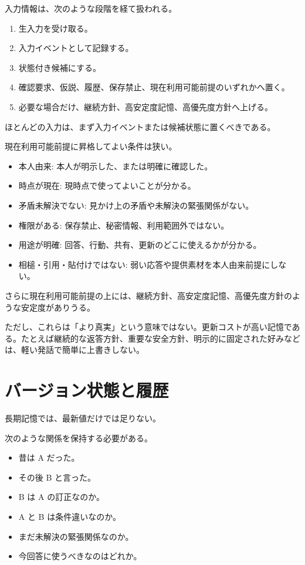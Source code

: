 \documentclass[12pt,a4paper]{article}
\begin{document}
入力情報は、次のような段階を経て扱われる。

\begin{enumerate}
\def\labelenumi{\arabic{enumi}.}
\tightlist
\item
  生入力を受け取る。
\item
  入力イベントとして記録する。
\item
  状態付き候補にする。
\item
  確認要求、仮説、履歴、保存禁止、現在利用可能前提のいずれかへ置く。
\item
  必要な場合だけ、継続方針、高安定度記憶、高優先度方針へ上げる。
\end{enumerate}

ほとんどの入力は、まず入力イベントまたは候補状態に置くべきである。

現在利用可能前提に昇格してよい条件は狭い。

\begin{itemize}
\tightlist
\item
  本人由来: 本人が明示した、または明確に確認した。
\item
  時点が現在: 現時点で使ってよいことが分かる。
\item
  矛盾未解決でない: 見かけ上の矛盾や未解決の緊張関係がない。
\item
  権限がある: 保存禁止、秘密情報、利用範囲外ではない。
\item
  用途が明確: 回答、行動、共有、更新のどこに使えるかが分かる。
\item
  相槌・引用・貼付けではない: 弱い応答や提供素材を本人由来前提にしない。
\end{itemize}

さらに現在利用可能前提の上には、継続方針、高安定度記憶、高優先度方針のような安定度がありうる。

ただし、これらは「より真実」という意味ではない。更新コストが高い記憶である。たとえば継続的な返答方針、重要な安全方針、明示的に固定された好みなどは、軽い発話で簡単に上書きしない。

\section{バージョン状態と履歴}\label{ux30d0ux30fcux30b8ux30e7ux30f3ux72b6ux614bux3068ux5c65ux6b74}

長期記憶では、最新値だけでは足りない。

次のような関係を保持する必要がある。

\begin{itemize}
\tightlist
\item
  昔は A だった。
\item
  その後 B と言った。
\item
  B は A の訂正なのか。
\item
  A と B は条件違いなのか。
\item
  まだ未解決の緊張関係なのか。
\item
  今回答に使うべきなのはどれか。
\end{itemize}
\end{document}
